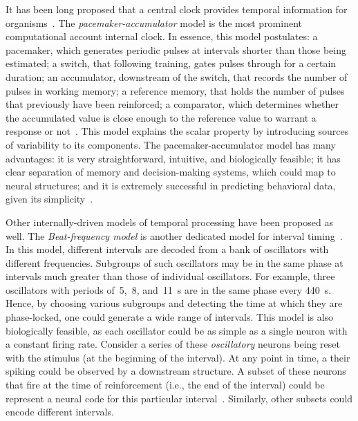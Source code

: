 It has been long proposed that a central clock provides temporal information for organisms~\cite{gibbon1984AnnalsNYAS}.
The \emph{pacemaker-accumulator} model is the most prominent computational account internal clock.
In essence, this model postulates:
    a pacemaker, which generates periodic pulses at intervals shorter than those being estimated;
    a switch, that following training, gates pulses through for a certain duration;
    an accumulator, downstream of the switch, that records the number of pulses in working memory;
    a reference memory, that holds the number of pulses that previously have been reinforced;
    a comparator, which determines whether the accumulated value is close enough to the reference value to warrant a response or not~\cite{gibbon1984AnnalsNYAS}.
This model explains the scalar property by introducing sources of variability to its components.
The pacemaker-accumulator model has many advantages:
    it is very straightforward, intuitive, and biologically feasible;
    it has clear separation of memory and decision-making systems, which could map to neural structures;
    and it is extremely successful in predicting behavioral data, given its simplicity~\cite{Buhusi2005NatRevNeuro}.
\par
Other internally-driven models of temporal processing have been proposed as well.
The \emph{Beat-frequency model} is another dedicated model for interval timing~\cite{Paton2018NeuronRev}.
In this model, different intervals are decoded from a bank of oscillators with different frequencies.
Subgroups of such oscillators may be in the same phase at intervals much greater than those of individual oscillators.
For example, three oscillators with periods of~5,~8, and~11~s are in the same phase every 440~s.\footnotemark
{}
Hence, by choosing various subgroups and detecting the time at which they are phase-locked, one could generate a wide range of intervals.
This model is also biologically feasible, as each oscillator could be as simple as a single neuron with a constant firing rate.
Consider a series of these \textit{oscillatory} neurons being reset with the stimulus (at the beginning of the interval).
At any point in time, a their spiking could be observed by a downstream structure.
A subset of these neurons that fire at the time of reinforcement (i.e., the end of the interval) could be represent a neural code for this particular interval~\cite{Matell2004CogBrainRes}.
Similarly, other subsets could encode different intervals.
